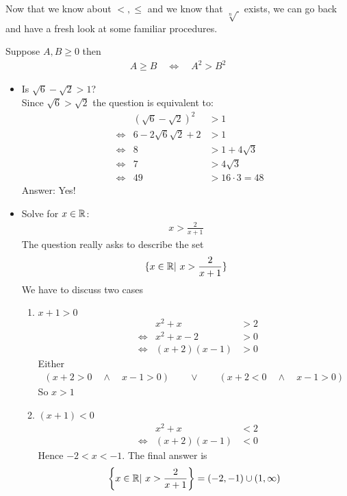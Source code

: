 Now that we know about $<, \le$ and we know that $\sqrt[n] ~$ exists, we can go back and have a fresh look at some familiar procedures.


\begin{ec}
	Suppose $A,B \ge 0$ then
	\begin{align*}
	A \ge B \quad \Leftrightarrow \quad A^2>B^2
	\end{align*}
\end{ec}


\begin{ex} 
	\begin{itemize}
	\item
	Is $\sqrt 6 - \sqrt 2 > 1$? \\
	Since $\sqrt 6 > \sqrt 2$ the question is equivalent to:
	\begin{align*}
	& & (\sqrt 6 - \sqrt 2)^2 & > 1 \\
	& \Leftrightarrow &  6 - 2 \sqrt 6 \sqrt 2 + 2 & > 1 \\
	& \Leftrightarrow &  8 & > 1+ 4\sqrt 3 \\
	& \Leftrightarrow & 7 & > 4 \sqrt 3 \\
	& \Leftrightarrow & 49 & > 16 \cdot 3 = 48
	\end{align*}
	Answer: Yes!
	\item
	Solve for $x \in \mathbb R$:
	\begin{align*}
	x > \frac 2{x+1}
	\end{align*}
	The question really asks to describe the set
	\begin{align*}
	\{ x \in \mathbb R| ~ x>\frac 2 {x+1} \}
	\end{align*}
	We have to discuss two cases
	\begin{enumerate}
		\item
		$x+1 >0$ 
		\begin{align*}
		& & x^2 + x & >2  \\
		& \Leftrightarrow & x^2 +x -2  & > 0 \\
		& \Leftrightarrow & (x+2)(x-1) & > 0
		\end{align*}
		Either 
		\begin{align*}
		(x+2 > 0 \quad \wedge\quad  x-1 >0) \qquad \vee \qquad (x+2 < 0 \quad \wedge \quad x-1 >0)
		\end{align*}
		So $x >1$
		\item 
		$(x+1) <0$ 
		\begin{align*}
		& & x^2 + x & <2  \\
		& \Leftrightarrow & (x+2)(x-1) & < 0
		\end{align*}
		Hence $-2<x<-1$. The final answer is 
		\begin{align*}
		\left\{ x \in \mathbb R|~ x> \frac 2 {x+1} \right\}  = (-2,-1) \cup (1, \infty)
		\end{align*}
	\end{enumerate}
\end{itemize}
\end{ex}



